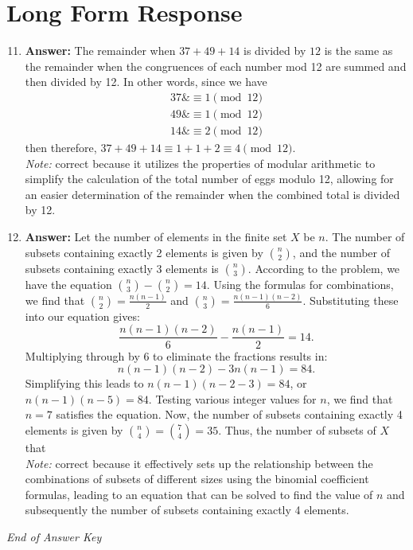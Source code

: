 \documentclass[12pt]{article}
\begin{document}
\section*{Long Form Response}
\begin{enumerate}[label=\arabic*.]
\setcounter{enumi}{10}
\item \textbf{Answer:} The remainder when $37+49+14$ is divided by $12$ is the same as the remainder when the congruences of each number mod 12 are summed and then divided by 12. In other words, since we have \begin{align*} 37 \&\ensuremath{\equiv} 1\ensuremath{\pmod{12}}\\ 49 \&\ensuremath{\equiv} 1\ensuremath{\pmod{12}} \\ 14 \&\ensuremath{\equiv} 2\ensuremath{\pmod{12}} \end{align*}then therefore, $37+49+14 \equiv 1+1+2 \equiv \boxed{4}\pmod{12}$.
\\ \textit{Note:} correct because it utilizes the properties of modular arithmetic to simplify the calculation of the total number of eggs modulo 12, allowing for an easier determination of the remainder when the combined total is divided by 12.
\item \textbf{Answer:} Let the number of elements in the finite set \( X \) be \( n \). The number of subsets containing exactly 2 elements is given by \( \binom{n}{2} \), and the number of subsets containing exactly 3 elements is \( \binom{n}{3} \). According to the problem, we have the equation \( \binom{n}{3} - \binom{n}{2} = 14 \). Using the formulas for combinations, we find that \( \binom{n}{2} = \frac{n(n-1)}{2} \) and \( \binom{n}{3} = \frac{n(n-1)(n-2)}{6} \). Substituting these into our equation gives: \[ \frac{n(n-1)(n-2)}{6} - \frac{n(n-1)}{2} = 14. \] Multiplying through by 6 to eliminate the fractions results in: \[ n(n-1)(n-2) - 3 n(n-1) = 84. \] Simplifying this leads to \( n(n-1)(n-2 - 3) = 84 \), or \( n(n-1)(n-5) = 84 \). Testing various integer values for \( n \), we find that \( n = 7 \) satisfies the equation. Now, the number of subsets containing exactly 4 elements is given by \( \binom{n}{4} = \binom{7}{4} = 35 \). Thus, the number of subsets of \( X \) that
\\ \textit{Note:} correct because it effectively sets up the relationship between the combinations of subsets of different sizes using the binomial coefficient formulas, leading to an equation that can be solved to find the value of \( n \) and subsequently the number of subsets containing exactly 4 elements.
\end{enumerate}

\vfill
\noindent\textit{End of Answer Key}
\end{document}

